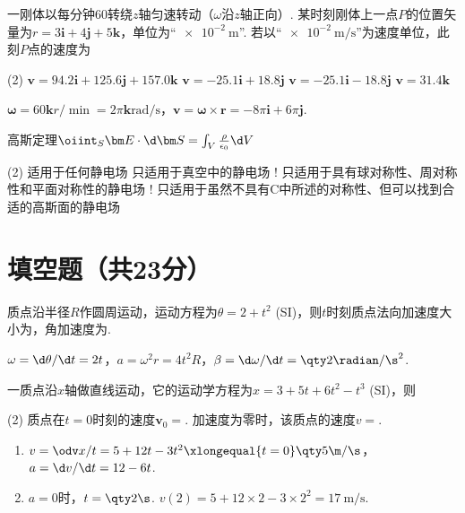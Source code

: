 \begin{problem} %
    一刚体以每分钟$60$转绕$z$轴匀速转动（$\omega$沿$z$轴正向）. 某时刻刚体上一点$P$的位置矢量为$r=3\bm i+4\bm j+5\bm k$，单位为``$\qty{e-2}\m$''. 若以``$\qty{e-2}{\m/\s}$''为速度单位，此刻$P$点的速度为
    \begin{tasks}(2)
        \task $\bm v=94.2\bm i+125.6\bm j+157.0\bm k$
        \task[\true] $\bm v=-25.1\bm i+18.8\bm j$
        \task $\bm v=-25.1\bm i-18.8\bm j$
        \task $\bm v=31.4\bm k$
    \end{tasks}
\end{problem}
\begin{solution}
    $\bm\omega=60\bm k\unit{r/\min}=2\pi\bm k\unit{\radian/\s}$，$\bm v=\bm\omega\times\bm r=-8\pi\bm i+6\pi\bm j$.
\end{solution}

\begin{problem}
    高斯定理$\oiint_S{\bm E\cdot\d\bm S}=\int_V{\frac{\rho}{\epsilon_0}\d V}$
    \begin{tasks}(2)
        \task[\true] 适用于任何静电场
        \task 只适用于真空中的静电场
        \task! 只适用于具有球对称性、周对称性和平面对称性的静电场
        \task! 只适用于虽然不具有C中所述的对称性、但可以找到合适的高斯面的静电场
    \end{tasks}
\end{problem}

\section{填空题（共23分）}

\begin{problem}
质点沿半径$R$作圆周运动，运动方程为$\theta=2+t^2$ (SI)，则$t$时刻质点法向加速度大小为，角加速度为.
\end{problem}
\begin{solution}
    $\omega=\d\theta/\d t=2t$，$a=\omega^2r=4t^2R$，$\beta=\d\omega/\d t=\qty2{\radian/\s^2}$.
\end{solution}

\begin{problem}
    一质点沿$x$轴做直线运动，它的运动学方程为$x=3+5t+6t^2-t^3$ (SI)，则
    \begin{tasks}[label=\arabic*.](2)
        \task 质点在$t=0$时刻的速度$\bm v_0=$.
        \task 加速度为零时，该质点的速度$v=$.
    \end{tasks}
\end{problem}
\begin{solution}\leavevmode
\begin{enumerate}
    \item $v=\odv x/t=5+12t-3t^2\xlongequal{t=0}\qty5{\m/\s}$，$a=\d v/\d t=12-6t$.
    \item $a=0$时，$t=\qty2\s$. $v(2)=5+12\times 2-3\times 2^2=\qty{17}{\m/\s}$.
\end{enumerate}
\end{solution}

